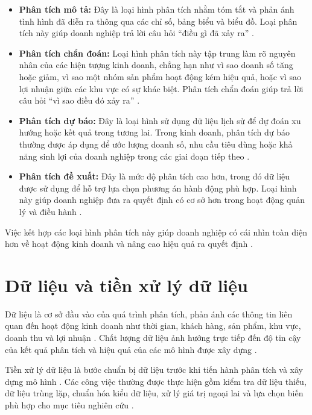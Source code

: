 \begin{itemize}
    \item \textbf{Phân tích mô tả:} Đây là loại hình phân tích nhằm tóm tắt và phản ánh tình hình đã diễn ra thông qua các chỉ số, bảng biểu và biểu đồ. Loại phân tích này giúp doanh nghiệp trả lời câu hỏi ``điều gì đã xảy ra'' \cite{islr}.
    
    \item \textbf{Phân tích chẩn đoán:} Loại hình phân tích này tập trung làm rõ nguyên nhân của các hiện tượng kinh doanh, chẳng hạn như vì sao doanh số tăng hoặc giảm, vì sao một nhóm sản phẩm hoạt động kém hiệu quả, hoặc vì sao lợi nhuận giữa các khu vực có sự khác biệt. Phân tích chẩn đoán giúp trả lời câu hỏi ``vì sao điều đó xảy ra'' \cite{esl}.
    
    \item \textbf{Phân tích dự báo:} Đây là loại hình sử dụng dữ liệu lịch sử để dự đoán xu hướng hoặc kết quả trong tương lai. Trong kinh doanh, phân tích dự báo thường được áp dụng để ước lượng doanh số, nhu cầu tiêu dùng hoặc khả năng sinh lợi của doanh nghiệp trong các giai đoạn tiếp theo \cite{islr,esl}.
    
    \item \textbf{Phân tích đề xuất:} Đây là mức độ phân tích cao hơn, trong đó dữ liệu được sử dụng để hỗ trợ lựa chọn phương án hành động phù hợp. Loại hình này giúp doanh nghiệp đưa ra quyết định có cơ sở hơn trong hoạt động quản lý và điều hành \cite{esl}.
\end{itemize}

Việc kết hợp các loại hình phân tích này giúp doanh nghiệp có cái nhìn toàn diện hơn về hoạt động kinh doanh và nâng cao hiệu quả ra quyết định \cite{islr,esl}.

\section{Dữ liệu và tiền xử lý dữ liệu}

Dữ liệu là cơ sở đầu vào của quá trình phân tích, phản ánh các thông tin liên quan đến hoạt động kinh doanh như thời gian, khách hàng, sản phẩm, khu vực, doanh thu và lợi nhuận \cite{islr,geron}. Chất lượng dữ liệu ảnh hưởng trực tiếp đến độ tin cậy của kết quả phân tích và hiệu quả của các mô hình được xây dựng \cite{geron}.

Tiền xử lý dữ liệu là bước chuẩn bị dữ liệu trước khi tiến hành phân tích và xây dựng mô hình \cite{islr,geron}. Các công việc thường được thực hiện gồm kiểm tra dữ liệu thiếu, dữ liệu trùng lặp, chuẩn hóa kiểu dữ liệu, xử lý giá trị ngoại lai và lựa chọn biến phù hợp cho mục tiêu nghiên cứu \cite{geron}.

